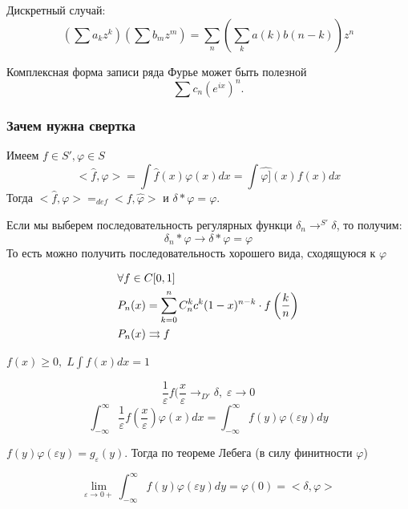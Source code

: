 \begin{example}
    Дискретный случай: 
    \[ (\sum a_k z^k)(\sum b_m z^m) = \sum_n (\sum_k a(k) b(n-k)) z^n\]
\end{example}

\begin{example}
    Комплексная форма записи ряда Фурье может быть полезной \[\sum c_n (e^{ix})^n.\]
\end{example}

\subsubsection{Зачем нужна свертка}

Имеем  $f \in S', \varphi \in S$
\[
<\widehat{f}, \varphi> = \int \widehat{f}(x) \varphi(x) dx = \int \widehat{\varphi]}(x) f(x) dx
\]
Тогда \(<\widehat{f}, \varphi> =_{\textit{def}} <f, \widehat{\varphi}>\) и $\delta * \varphi = \varphi$.

Если мы выберем последовательность регулярных функци $\delta_n \to^{S'} \delta$, то получим:
\[ \delta_n * \varphi \to \delta * \varphi = \varphi \]
То есть можно получить последовательность хорошего вида, сходящуюся к $\varphi$

\begin{note}
    \begin{align*}
        &\forall f \in C[0, 1] \\
        &P_n(x) = \sum_{k = 0}^n C^k_n c^k (1-x)^{n - k} \cdot f\left(\frac{k}{n}\right)\\
        &P_n(x) \rightrightarrows f
    \end{align*}
\end{note}

\begin{example}
    $f(x)\geq 0, \; L\int f(x)dx=1$

    \[ \frac{1}{\varepsilon} f(\frac{x}{\varepsilon} \to_{D'} \delta, \; \varepsilon \to 0\]
    \[ \int_{-\infty}^{\infty} \frac{1}{\varepsilon} f(\frac{x}{\varepsilon}) \varphi(x) dx = \int_{-\infty}^{\infty} f(y) \varphi(\varepsilon y) dy\]

    \( f(y)\varphi(\varepsilon y) = g_\varepsilon (y) \). Тогда по теореме Лебега (в силу финитности $\varphi$)

    \[ \lim_{\varepsilon \to 0+} \int_{-\infty}^{\infty} f(y) \varphi(\varepsilon y) dy = \varphi(0) = <\delta, \varphi>\]
\end{example}
